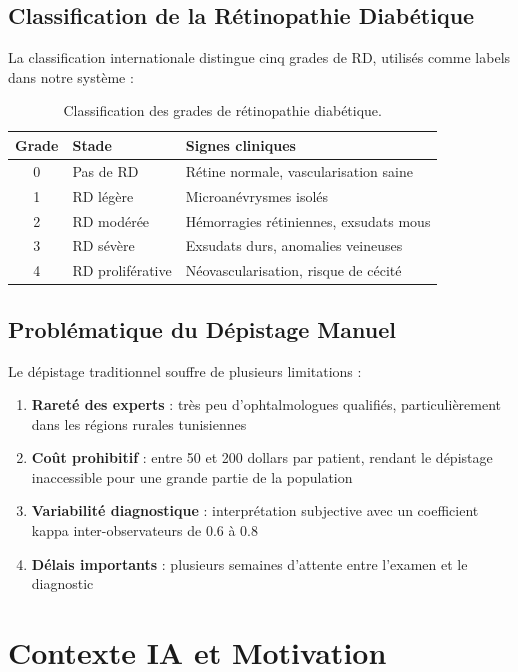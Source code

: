 \documentclass[12pt,a4paper,oneside]{report}
\begin{document}
\subsection{Classification de la Rétinopathie Diabétique}

La classification internationale distingue cinq grades de RD, utilisés
comme labels dans notre système :

\begin{table}[H]
\centering
\caption{Classification des grades de rétinopathie diabétique.}
\label{tab:dr_grades}
\begin{tabular}{|c|l|p{7cm}|}
\hline
\textbf{Grade} & \textbf{Stade} & \textbf{Signes cliniques} \\
\hline
0 & Pas de RD & Rétine normale, vascularisation saine \\
1 & RD légère & Microanévrysmes isolés \\
2 & RD modérée & Hémorragies rétiniennes, exsudats mous \\
3 & RD sévère & Exsudats durs, anomalies veineuses \\
4 & RD proliférative & Néovascularisation, risque de cécité \\
\hline
\end{tabular}
\end{table}

\subsection{Problématique du Dépistage Manuel}

Le dépistage traditionnel souffre de plusieurs limitations :

\begin{enumerate}
    \item \textbf{Rareté des experts} : très peu d'ophtalmologues qualifiés,
          particulièrement dans les régions rurales tunisiennes
    \item \textbf{Coût prohibitif} : entre 50 et 200 dollars par patient,
          rendant le dépistage inaccessible pour une grande partie de la
          population
    \item \textbf{Variabilité diagnostique} : interprétation subjective
          avec un coefficient kappa inter-observateurs de 0.6 à 0.8
    \item \textbf{Délais importants} : plusieurs semaines d'attente entre
          l'examen et le diagnostic
\end{enumerate}

\section{Contexte IA et Motivation}
\end{document}
